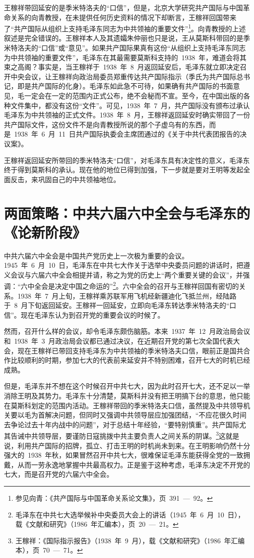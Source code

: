 王稼祥带回延安的是季米特洛夫的“口信”，但是，北京大学研究共产国际与中国革命关系的向青教授，在未提供任何历史资料的情况下却断言，王稼祥回国带来了“共产国际从组织上支持毛泽东同志为中共领袖的重要文件”\footnote{参见向青：《共产国际与中国革命关系论文集》，页~391~—~92。}。向青教授的上述叙述是完全错误的。王稼祥本人及其遗孀朱仲丽也只是说，王从莫斯科带回的是季米特洛夫的“口信”或“意见”。如果共产国际果真有这份“从组织上支持毛泽东同志为中共领袖的重要文件”，毛泽东在其最需要莫斯科支持的~1938~年，难道会将其束之高阁？事实是，当王稼祥于~1938~年~8~月返回延安后，毛泽东就立即决定召开中央会议，让王稼祥向政治局委员郑重传达共产国际指示（季氏为共产国际总书记，即是共产国际的化身）。毛泽东如此急不可待，如果确有共产国际的书面意见，毛一定会在一定的范围内正式公布，绝不会秘而不宣。至今，在中国出版的各种文件集中，都没有这份“文件”。可见，1938~年~7~月，共产国际没有颁布过承认毛泽东为中共领袖的正式文件。1938~年~8~月，王稼祥返回延安时确实带回了一份共产国际文件，这份文件不是向青教授所说的那个子虚乌有的东西，而是~1938~年~6~月~11~日共产国际执委会主席团通过的《关于中共代表团报告的决议案》。

王稼祥返回延安所带回的季米特洛夫“口信”，对毛泽东具有决定性的意义，毛泽东终于得到莫斯科的承认。现在他的地位已得到加强，下一步就是要对王明等发起全面反击，来巩固自己的中共领袖地位。

\section{两面策略：中共六届六中全会与毛泽东的《论新阶段》}

中共六届六中全会是中国共产党历史上一次极为重要的会议。1945~年~6~月~10~日，毛泽东在中共七大作关于选举中央委员问题的讲话时，把遵义会议与六届六中全会相提并请，称之为党的历史上“两个重要关键的会议”，并强调：“六中全会是决定中国之命运的”\footnote{毛泽东在中共七大选举候补中央委员大会上的讲话（1945~年~6~月~10~日），载《文献和研究》（1986~年汇编本），页~20~—~21。}。六中全会的召开与王稼祥回国有密切的关系。1938~年~7~月上旬，王稼祥乘苏联军用飞机经新疆迪化飞抵兰州，经陆路于~8~月下旬返回延安。王稼祥一回延安，立即向毛泽东转达季米特洛夫的“口信”。现在毛泽东认为到召开党的重要会议的时候了。

然而，召开什么样的会议，却令毛泽东颇伤脑筋。本来~1937~年~12~月政治局会议和~1938~年~3~月政治局会议都已通过决议，在近期召开党的第七次全国代表大会，现在王稼祥已带回支持毛泽东为中共领袖的季米特洛夫口信，眼前正是国共合作比较顺利的时期，参加七大的代表前来延安并不特别困难，召开七大的时机已经成熟。

但是，毛泽东并不想在这个时候召开中共七大，因为此时召开七大，还不足以一举消除王明及其势力。毛泽东十分清楚，莫斯科并没有把王明搞下台的意思，他只能在莫斯科划定的范围内活动。王稼祥带回的季米特洛夫口信，虽然提及中共领导机关要以毛为首解决问题，但同时又强调中共领导层应加强团结，“不应花很久时间去争论过去十年内战中的问题”，对于总结十年经验，“要特别慎重”。共产国际尤其告诫中共领导层，要谨防日寇挑拨中共主要负责人之间关系的阴谋。\footnote{王稼祥：《国际指示报告》（1938~年~9~月），载《文献和研究》（1986~年汇编本），页~70~—~71。}这就是说，利用共产国际的招牌，孤立、打击王明的时机尚未到来。在王明影响仍然十分强大的~1938~年秋，如果冒然召开中共七大，很难保证毛泽东能获得全党的一致拥戴，从而一劳永逸地掌握中共最高权力。正是鉴于这种考虑，毛泽东决定不开党的七大，而是召开党的六届六中全会。

